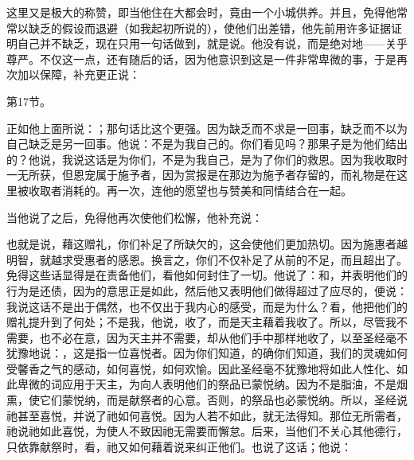 这里又是极大的称赞，即当他住在大都会时，竟由一个小城供养。并且，免得他常常以缺乏的假设而退避（如我起初所说的），使他们出差错，他先前用许多证据证明自己并不缺乏，现在只用一句话做到，就是说。他没有说，而是绝对地——关乎尊严。不仅这一点，还有随后的话，因为他意识到这是一件非常卑微的事，于是再次加以保障，补充更正说：\par

第17节。\par

正如他上面所说：；那句话比这个更强。因为缺乏而不求是一回事，缺乏而不以为自己缺乏是另一回事。他说：不是为我自己的。你们看见吗？那果子是为他们结出的？他说，我说这话是为你们，不是为我自己，是为了你们的救恩。因为我收取时一无所获，但恩宠属于施予者，因为赏报是在那边为施予者存留的，而礼物是在这里被收取者消耗的。再一次，连他的愿望也与赞美和同情结合在一起。\par

当他说了之后，免得他再次使他们松懈，他补充说：\par

 也就是说，藉这赠礼，你们补足了所缺欠的，这会使他们更加热切。因为施惠者越明智，就越求受惠者的感恩。换言之，你们不仅补足了从前的不足，而且超出了。免得这些话显得是在责备他们，看他如何封住了一切。他说了：和，并表明他们的行为是还债，因为的意思正是如此，然后他又表明他们做得超过了应尽的，便说：我说这话不是出于偶然，也不仅出于我内心的感受，而是为什么？看，他把他们的赠礼提升到了何处；不是我，他说，收了，而是天主藉着我收了。所以，尽管我不需要，也不必在意，因为天主并不需要，却从他们手中那样地收了，以至圣经毫不犹豫地说：，这是指一位喜悦者。因为你们知道，的确你们知道，我们的灵魂如何受馨香之气的感动，如何喜悦，如何欢愉。因此圣经毫不犹豫地将如此人性化、如此卑微的词应用于天主，为向人表明他们的祭品已蒙悦纳。因为不是脂油，不是烟熏，使它们蒙悦纳，而是献祭者的心意。否则，的祭品也必蒙悦纳。所以，圣经说祂甚至喜悦，并说了祂如何喜悦。因为人若不如此，就无法得知。那位无所需者，祂说祂如此喜悦，为使人不致因祂无需要而懈怠。后来，当他们不关心其他德行，只依靠献祭时，看，祂又如何藉着说来纠正他们。也说了这话；他说：\par

